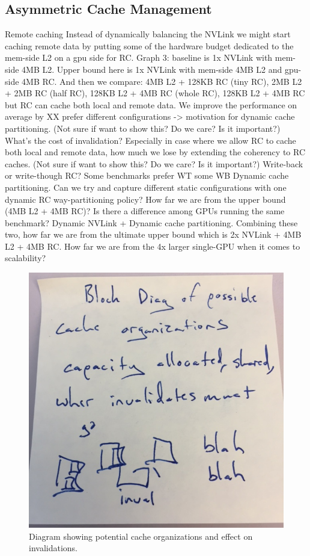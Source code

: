 \subsection{Asymmetric Cache Management}
\label{caching}
Remote caching
Instead of dynamically balancing the NVLink we might start caching remote data 
by putting some of the hardware budget dedicated to the mem-side L2 on a gpu 
side for RC. 
Graph 3: baseline is 1x NVLink with mem-side 4MB L2. Upper bound here is 1x 
NVLink with mem-side 4MB L2 and gpu-side 4MB RC. And then we compare: 4MB L2 + 
128KB RC (tiny RC), 2MB L2 + 2MB RC (half RC), 128KB L2 + 4MB RC (whole RC), 
128KB L2 + 4MB RC but RC can cache both local and remote data. We improve the 
performance on average by XX%
prefer different configurations -> motivation for dynamic cache partitioning. 
(Not sure if want to show this? Do we care? Is it important?) What’s the cost of 
invalidation? Especially in case where we allow RC to cache both local and 
remote data, how much we lose by extending the coherency to RC caches. 
(Not sure if want to show this? Do we care? Is it important?) Write-back or 
write-though RC? Some benchmarks prefer WT some WB
Dynamic cache partitioning. Can we try and capture different static 
configurations with one dynamic RC way-partitioning policy? How far we are from 
the upper bound (4MB L2 + 4MB RC)? Is there a difference among GPUs running the 
same benchmark? 
Dynamic NVLink + Dynamic cache partitioning. Combining these two, how far we are 
from the ultimate upper bound which is 2x NVLink + 4MB L2 + 4MB RC. How far we 
are from the 4x larger single-GPU when it comes to scalability?

\begin{figure}[tp]
    \centering
    \includegraphics[width=0.9\columnwidth]{figures/cacheorg.jpg}
    \caption{Diagram showing potential cache organizations and effect on 
invalidations.}
    \label{fig:cacheorg}
\end{figure}



